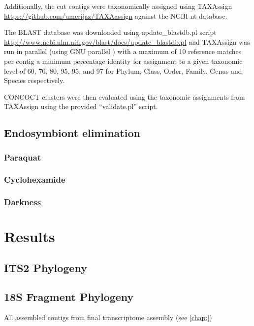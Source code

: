 Additionally, the cut contigs were taxonomically assigned 
using TAXAssign \url{https://github.com/umerijaz/TAXAassign} against the NCBI nt database. 

The BLAST database was downloaded using update\_blastdb.pl script \url{http://www.ncbi.nlm.nih.gov/blast/docs/update_blastdb.pl}
and TAXAssign was run in parallel (using GNU parallel \citep{Tange2011a})
with a maximum of 10 reference matches
per contig a minimum percentage identity for assignment
to a given taxonomic level of 60, 70, 80, 95, 95, and 97
for Phylum, Class, Order, Family, Genus and Species respectively. 


CONCOCT clusters were then evaluated using the taxonomic assignments from TAXAssign
using the provided ``validate.pl'' script.




\subsection{Endosymbiont elimination}

\subsubsection{Paraquat}

\subsubsection{Cyclohexamide}

\subsubsection{Darkness}




\section{Results}

\subsection{ITS2 Phylogeny}



\subsection{18S Fragment Phylogeny}

All assembled contigs from final transcriptome assembly (see \ref{chap:})


